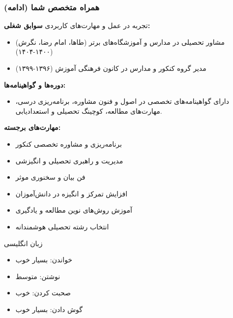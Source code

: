 \documentclass[aspectratio=169]{beamer}
\begin{document}
\begin{frame}[fragile]
  \frametitle{همراه متخصص شما (ادامه)}

  \begin{block}{تجربه در عمل و مهارت‌های کاربردی}
    \textbf{سوابق شغلی:}
    \begin{itemize}
      \item مشاور تحصیلی در مدارس و آموزشگاه‌های برتر (طاها، امام رضا، نگرش) (۱۴۰۰-۱۴۰۴)
      \item مدیر گروه کنکور و مدارس در کانون فرهنگی آموزش (۱۳۹۶-۱۳۹۹)
    \end{itemize}
    \textbf{دوره‌ها و گواهینامه‌ها:}
    \begin{itemize}
      \item دارای گواهینامه‌های تخصصی در اصول و فنون مشاوره، برنامه‌ریزی درسی، مهارت‌های مطالعه، کوچینگ تحصیلی و استعدادیابی.
    \end{itemize}
    \textbf{مهارت‌های برجسته:}
    \begin{itemize}
      \item برنامه‌ریزی و مشاوره تخصصی کنکور
      \item مدیریت و راهبری تحصیلی و انگیزشی
      \item فن بیان و سخنوری موثر
      \item افزایش تمرکز و انگیزه در دانش‌آموزان
      \item آموزش روش‌های نوین مطالعه و یادگیری
      \item انتخاب رشته تحصیلی هوشمندانه
    \end{itemize}
  \end{block}

  \begin{block}{زبان انگلیسی}
      \begin{itemize}
          \item خواندن: بسیار خوب
          \item نوشتن: متوسط
          \item صحبت کردن: خوب
          \item گوش دادن: بسیار خوب
      \end{itemize}
  \end{block}
\end{frame}
\end{document}
